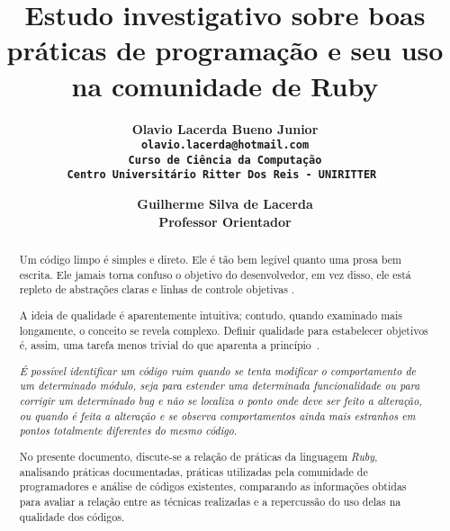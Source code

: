 \documentclass[11pt,a4paper,usenames,dvipsnames]{article}
\begin{document}
\title{Estudo investigativo sobre boas práticas de programação e seu uso na comunidade de Ruby}

\author{ \bf Olavio Lacerda Bueno Junior\\
		\tt olavio.lacerda@hotmail.com \\
		Curso de Ciência da Computação \\
		Centro Universitário Ritter Dos Reis - UNIRITTER 
		\and
 		\bf Guilherme Silva de Lacerda\\
		Professor Orientador\\
}

\maketitle
\thispagestyle{empty}

\begin{abstract}
   Um código limpo é simples e direto. Ele é tão bem legível quanto uma prosa bem escrita. Ele jamais torna confuso o objetivo do desenvolvedor, em vez disso, ele está repleto de abstrações claras e linhas de controle objetivas \cite{martin2009clean}.
   
   A ideia de qualidade é aparentemente intuitiva; contudo, quando examinado mais
   longamente, o conceito se revela complexo. Definir qualidade para estabelecer objetivos
   é, assim, uma tarefa menos trivial do que aparenta a princípio~\cite{Novatec:Qualidade}.
   
   \textit{É possível identificar um código ruim quando se tenta modificar o
   comportamento de um determinado módulo, seja para estender uma determinada
   funcionalidade ou para corrigir um determinado bug e não se localiza o ponto
   onde deve ser feito a alteração, ou quando é feita a alteração e se observa
   comportamentos ainda mais estranhos em pontos totalmente diferentes do
   mesmo código}\cite{de2016estudo}.
   
   No presente documento, discute-se a relação de práticas da linguagem \textit{Ruby}, analisando práticas documentadas, práticas utilizadas pela comunidade de programadores e análise de códigos existentes, comparando as informações obtidas para avaliar a relação entre as técnicas realizadas e a repercussão do uso delas na qualidade dos códigos. 
    
\end{abstract}
\end{document}
